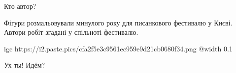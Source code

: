  
 
 
 
 

\qqSecCmt


Кто автор?

\begin{itemize} %

Фігури розмальовували минулого року для писанкового фестивалю у Києві. Автори
робіт згадані у спільноті фестивалю.


\ifcmt
  igc https://i2.paste.pics/cfa2f5e3c9561ec959e9d21cb0680f34.png
	@width 0.1
\fi

\end{itemize} %


Ух ты! Идём?
